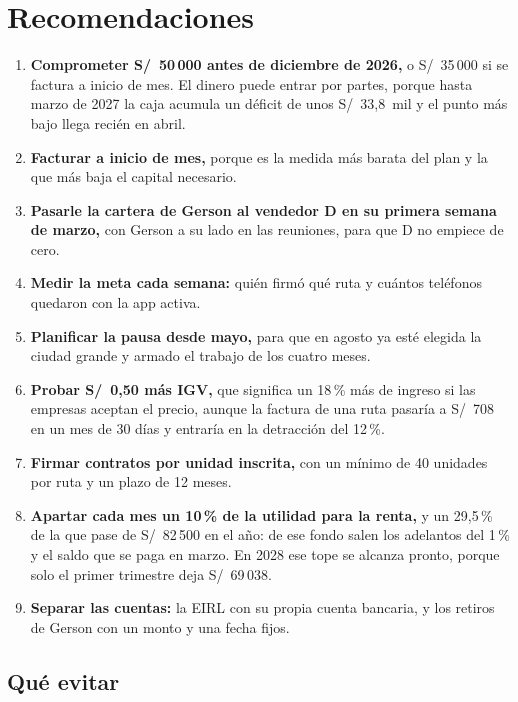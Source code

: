 \documentclass[10.5pt,a4paper]{article}
\begin{document}
\section{Recomendaciones}

\begin{enumerate}
\item \textbf{Comprometer S/~50\,000 antes de diciembre de 2026,} o S/~35\,000 si se factura a inicio de mes. El dinero puede entrar por partes, porque hasta marzo de 2027 la caja acumula un déficit de unos S/~33,8~mil y el punto más bajo llega recién en abril.
\item \textbf{Facturar a inicio de mes,} porque es la medida más barata del plan y la que más baja el capital necesario.
\item \textbf{Pasarle la cartera de Gerson al vendedor D en su primera semana de marzo,} con Gerson a su lado en las reuniones, para que D no empiece de cero.
\item \textbf{Medir la meta cada semana:} quién firmó qué ruta y cuántos teléfonos quedaron con la app activa.
\item \textbf{Planificar la pausa desde mayo,} para que en agosto ya esté elegida la ciudad grande y armado el trabajo de los cuatro meses.
\item \textbf{Probar S/~0,50 más IGV,} que significa un 18\,\% más de ingreso si las empresas aceptan el precio, aunque la factura de una ruta pasaría a S/~708 en un mes de 30 días y entraría en la detracción del 12\,\%.
\item \textbf{Firmar contratos por unidad inscrita,} con un mínimo de 40 unidades por ruta y un plazo de 12 meses.
\item \textbf{Apartar cada mes un 10\,\% de la utilidad para la renta,} y un 29,5\,\% de la que pase de S/~82\,500 en el año: de ese fondo salen los adelantos del 1\,\% y el saldo que se paga en marzo. En 2028 ese tope se alcanza pronto, porque solo el primer trimestre deja S/~69\,038.
\item \textbf{Separar las cuentas:} la EIRL con su propia cuenta bancaria, y los retiros de Gerson con un monto y una fecha fijos.
\end{enumerate}

\subsection{Qué evitar}
\end{document}
